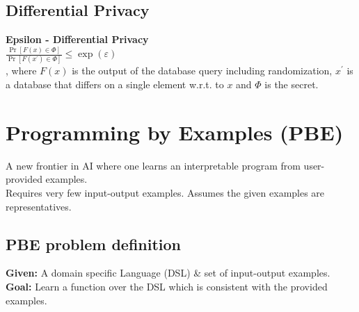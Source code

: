 \documentclass[11pt]{extarticle}
\begin{document}
\begin{multicols*}{3}
    \subsection*{Differential Privacy}
    \textbf{Epsilon - Differential Privacy}\\
	$\frac { \operatorname { Pr } [ F ( x ) \in \Phi ] } { \operatorname { Pr } \left[ F \left( x ^ { \prime } \right) \in \Phi \right] } \leq \exp ( \varepsilon )$\\
	, where $F ( x )$ is the output of the database query including randomization,  $x ^ { \prime }$ is a database that differs on a single element w.r.t. to $x$ and $\Phi$ is the secret.

\section{Programming by Examples (PBE)}
A new frontier in AI where one learns an
interpretable program from user-provided examples. \\
Requires very few input-output examples.
Assumes the given examples are representatives.
\subsection*{PBE problem definition}
\textbf{Given:} A domain specific Language (DSL) \& set of input-output examples.\\
\textbf{Goal:} Learn a function over the DSL which is consistent with the provided examples.\\


	\end{multicols*}
\end{document}
